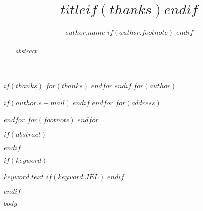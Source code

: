 \documentclass[
  $if(review)$ review $endif$ 
  $if(classoption)$, $classoption$ $endif$]{"$resoruce-path$/$modify_cls$"}
\begin{document}
  \begin{frontmatter}

    \title{$title$$if(thanks)$$endif$}
    $if(thanks)$
    $for(thanks)$
    $endfor$
    $endif$
    $for(author)$
    \author[$author.affiliation$]{
      $author.name$ 
      $if(author.footnote)$  $endif$}
    $if(author.e-mail)$  $endif$  %
    $endfor$
    $for(address)$
    \address[$address.code$]{$address.address$}
    $endfor$
    $for(footnote)$
    $endfor$
  
    $if(abstract)$
    \begin{abstract}
      $abstract$
    \end{abstract}
    $endif$
  
    $if(keyword)$
    \begin{keyword}
      $keyword.text$
      $if(keyword.JEL)$  $endif$
    \end{keyword}
    $endif$

  \end{frontmatter}

  $body$
\end{document}
